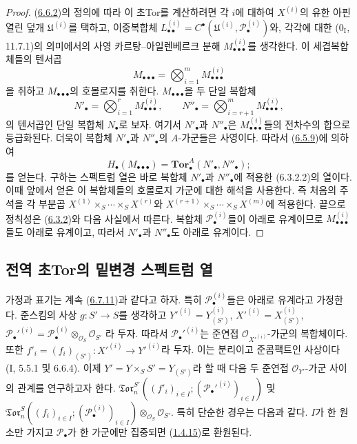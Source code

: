 \begin{proof}
(\hyperref[III.6.6.2-fr]{6.6.2})의 정의에 따라 이 초Tor를 계산하려면
각 $i$에 대하여 $X^{(i)}$의 유한 아핀 열린 덮개
$\mathfrak U^{(i)}$를 택하고, 이중복합체
$L_{\bullet\bullet}^{(i)}
=C^\bullet(\mathfrak U^{(i)},\mathscr P_\bullet^{(i)})$와, 각각에 대한
($0_{\mathrm I}$, 11.7.1)의 의미에서의 사영 카르탕--아일렌베르크
분해 $M_{\bullet\bullet\bullet}^{(i)}$를 생각한다. 이 세겹복합체들의 텐서곱
\[
  M_{\bullet\bullet\bullet}
  =\bigotimes_{i=1}^m M_{\bullet\bullet\bullet}^{(i)}
\]
을 취하고 $M_{\bullet\bullet\bullet}$의 호몰로지를 취한다.
$M_{\bullet\bullet\bullet}$을 두 단일 복합체
\[
  N'_\bullet=\bigotimes_{i=1}^r M_{\bullet\bullet\bullet}^{(i)},
  \qquad
  N''_\bullet=\bigotimes_{i=r+1}^m M_{\bullet\bullet\bullet}^{(i)},
\]
의 텐서곱인 단일 복합체 $N_\bullet$로 보자. 여기서
$N'_\bullet$과 $N''_\bullet$은
$M_{\bullet\bullet\bullet}^{(i)}$들의 전차수의 합으로 등급화된다.
더욱이 복합체 $N'_\bullet$과 $N''_\bullet$의 $A$-가군들은
사영이다. 따라서 (\hyperref[III.6.5.9-fr]{6.5.9})에 의하여
\[
  H_\bullet(M_{\bullet\bullet\bullet})
  =\mathbf{Tor}_\bullet^A(N'_\bullet,N''_\bullet);
\]
를 얻는다. 구하는 스펙트럼 열은 바로 복합체 $N'_\bullet$과
$N''_\bullet$에 적용한 (6.3.2.2)의 열이다. 이때 앞에서 얻은 이
복합체들의 호몰로지 가군에 대한 해석을 사용한다. 즉 처음의 주석을
각 부분곱
$X^{(1)}\times_S\cdots\times_S X^{(r)}$와
$X^{(r+1)}\times_S\cdots\times_S X^{(m)}$에 적용한다.
끝으로 정칙성은 (\hyperref[III.6.3.2-fr]{6.3.2})와 다음 사실에서
따른다. 복합체 $\mathscr P_\bullet^{(i)}$들이 아래로 유계이므로
$M_{\bullet\bullet\bullet}^{(i)}$들도 아래로 유계이고, 따라서
$N'_\bullet$과 $N''_\bullet$도 아래로 유계이다.
\end{proof}

\subsection{전역 초Tor의 밑변경 스펙트럼 열}
\label{subsection:III.6.9.fr}

\begin{env}[6.9.1]
\label{III.6.9.1-fr}
가정과 표기는 계속 (\hyperref[III.6.7.11-fr]{6.7.11})과 같다고
하자. 특히 $\mathscr P_\bullet^{(i)}$들은 아래로 유계라고 가정한다.
준스킴의 사상 $g:S'\to S$를 생각하고
$Y'^{(i)}=Y_{(S')}^{(i)}$, $X'^{(i)}=X_{(S')}^{(i)}$,
$\mathscr P_\bullet'^{(i)}
=\mathscr P_\bullet^{(i)}
\otimes_{\mathscr O_S}\mathscr O_{S'}$
라 두자. 따라서 $\mathscr P_\bullet'^{(i)}$는 준연접
$\mathscr O_{X'^{(i)}}$-가군의 복합체이다. 또한
$f'_i=(f_i)_{(S')}:X'^{(i)}\to Y'^{(i)}$라 두자. 이는 분리이고
준콤팩트인 사상이다 (I, 5.5.1 및 6.6.4). 이제
$Y'=Y\times_S S'=Y_{(S')}$라 할 때 다음 두 준연접
$\mathscr O_{Y'}$-가군 사이의 관계를 연구하고자 한다.
$\mathfrak{Tor}_n^{S'}((f'_i)_{i\in I};
(\mathscr P_\bullet'^{(i)})_{i\in I})$ 및
$\mathfrak{Tor}_n^S((f_i)_{i\in I};
(\mathscr P_\bullet^{(i)})_{i\in I})
\otimes_{\mathscr O_S}\mathscr O_{S'}$.
특히 단순한 경우는 다음과 같다. $I$가 한 원소만 가지고
$\mathscr P_\bullet$가 한 가군에만 집중되면
(\hyperref[III.1.4.15-fr]{1.4.15})로 환원된다.
\end{env}

